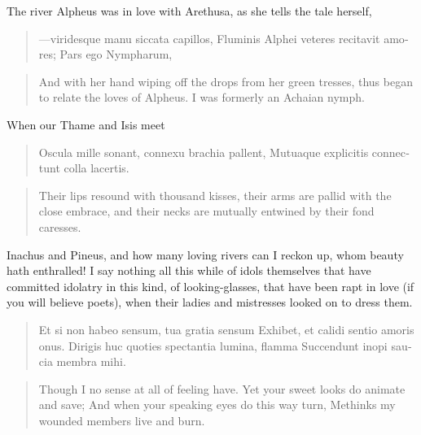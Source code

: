 The river Alpheus was in love with Arethusa, as she tells the
tale herself,

\begin{latin}
\begin{verse}%
---viridesque manu siccata capillos,
Fluminis Alphei veteres recitavit amores;
Pars ego Nympharum, \etc{}
\end{verse}%
\end{latin}
\translationrule%
\begin{verse}%
And with her hand wiping off the drops from her green tresses,
thus began to relate the loves of Alpheus.
I was formerly an Achaian nymph.
\end{verse}%

When our Thame and Isis meet

\begin{latin}
\begin{verse}%
Oscula mille sonant, connexu brachia pallent,
Mutuaque explicitis connectunt colla lacertis.
\end{verse}%
\end{latin}
\translationrule%
\begin{verse}%
Their lips resound with thousand kisses, their arms are pallid with the close embrace,
and their necks are mutually entwined by their fond caresses.
\end{verse}%

Inachus and Pineus, and how many loving rivers can I reckon up, whom
beauty hath enthralled! I say nothing all this while of idols
themselves that have committed idolatry in this kind, of
looking-glasses, that have been rapt in love (if you will believe
poets), when their ladies and mistresses looked on to dress them.

\begin{latin}
\begin{verse}%
Et si non habeo sensum, tua gratia sensum
Exhibet, et calidi sentio amoris onus.
Dirigis huc quoties spectantia lumina, flamma
Succendunt inopi saucia membra mihi.
\end{verse}%
\end{latin}
\translationrule%
\begin{verse}%
Though I no sense at all of feeling have.
Yet your sweet looks do animate and save;
And when your speaking eyes do this way turn,
Methinks my wounded members live and burn.
\end{verse}%

